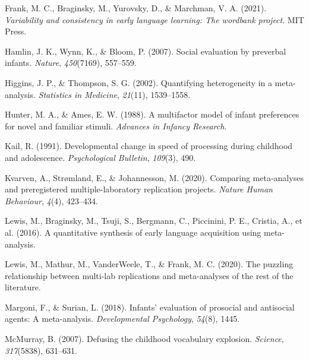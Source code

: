\documentclass[10pt, letterpaper]{article}
\newenvironment{CSLReferences}%
  {}%
  {\par}
\begin{document}
\begin{CSLReferences}{1}{0}
\leavevmode{}%
Frank, M. C., Braginsky, M., Yurovsky, D., \& Marchman, V. A. (2021).
\emph{Variability and consistency in early language learning: The
wordbank project}. MIT Press.

\leavevmode{}%
Hamlin, J. K., Wynn, K., \& Bloom, P. (2007). Social evaluation by
preverbal infants. \emph{Nature}, \emph{450}(7169), 557--559.

\leavevmode{}%
Higgins, J. P., \& Thompson, S. G. (2002). Quantifying heterogeneity in
a meta-analysis. \emph{Statistics in Medicine}, \emph{21}(11),
1539--1558.

\leavevmode{}%
Hunter, M. A., \& Ames, E. W. (1988). A multifactor model of infant
preferences for novel and familiar stimuli. \emph{Advances in Infancy
Research}.

\leavevmode{}%
Kail, R. (1991). Developmental change in speed of processing during
childhood and adolescence. \emph{Psychological Bulletin}, \emph{109}(3),
490.

\leavevmode{}%
Kvarven, A., Strømland, E., \& Johannesson, M. (2020). Comparing
meta-analyses and preregistered multiple-laboratory replication
projects. \emph{Nature Human Behaviour}, \emph{4}(4), 423--434.

\leavevmode{}%
Lewis, M., Braginsky, M., Tsuji, S., Bergmann, C., Piccinini, P. E.,
Cristia, A., et al. (2016). A quantitative synthesis of early language
acquisition using meta-analysis.

\leavevmode{}%
Lewis, M., Mathur, M., VanderWeele, T., \& Frank, M. C. (2020). The
puzzling relationship between multi-lab replications and meta-analyses
of the rest of the literature.

\leavevmode{}%
Margoni, F., \& Surian, L. (2018). Infants' evaluation of prosocial and
antisocial agents: A meta-analysis. \emph{Developmental Psychology},
\emph{54}(8), 1445.

\leavevmode{}%
McMurray, B. (2007). Defusing the childhood vocabulary explosion.
\emph{Science}, \emph{317}(5838), 631--631.


\end{CSLReferences}
\end{document}
